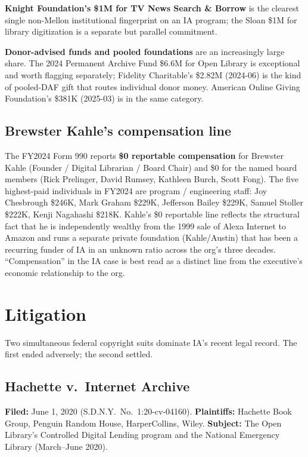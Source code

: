 \documentclass[10pt,letterpaper,twocolumn]{article}
\begin{document}
\textbf{Knight Foundation's \$1M for TV News Search \& Borrow} is the clearest single non-Mellon institutional fingerprint on an IA program; the Sloan \$1M for library digitization is a separate but parallel commitment.

\textbf{Donor-advised funds and pooled foundations} are an increasingly large share. The 2024 Permanent Archive Fund \$6.6M for Open Library is exceptional and worth flagging separately; Fidelity Charitable's \$2.82M (2024-06) is the kind of pooled-DAF gift that routes individual donor money. American Online Giving Foundation's \$381K (2025-03) is in the same category.

\subsection{Brewster Kahle's compensation line}

The FY2024 Form 990 reports \textbf{\$0 reportable compensation} for Brewster Kahle (Founder / Digital Librarian / Board Chair) and \$0 for the named board members (Rick Prelinger, David Rumsey, Kathleen Burch, Scott Fong). The five highest-paid individuals in FY2024 are program / engineering staff: Joy Chesbrough \$246K, Mark Graham \$229K, Jefferson Bailey \$229K, Samuel Stoller \$222K, Kenji Nagahashi \$218K. Kahle's \$0 reportable line reflects the structural fact that he is independently wealthy from the 1999 sale of Alexa Internet to Amazon and runs a separate private foundation (Kahle/Austin) that has been a recurring funder of IA in an unknown ratio across the org's three decades. ``Compensation'' in the IA case is best read as a distinct line from the executive's economic relationship to the org.

\section{Litigation}\label{sec:litigation}

Two simultaneous federal copyright suits dominate IA's recent legal record. The first ended adversely; the second settled.

\subsection{Hachette v.~Internet Archive}

\textbf{Filed:} June 1, 2020 (S.D.N.Y.~No.~1:20-cv-04160). \textbf{Plaintiffs:} Hachette Book Group, Penguin Random House, HarperCollins, Wiley. \textbf{Subject:} The Open Library's Controlled Digital Lending program and the National Emergency Library (March--June 2020).
\end{document}
